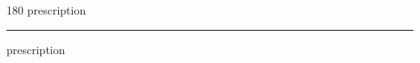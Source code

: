 
\begin{frame}
\begin{center}
\begin{turn}{180}
{\fontsize{2.5cm}{1em}\selectfont prescription}
\end{turn}
\vspace{1em}\par  
\hrule
\vspace{1em}\par  
{\fontsize{2.5cm}{1em}\selectfont prescription}
\end{center}
\end{frame}
